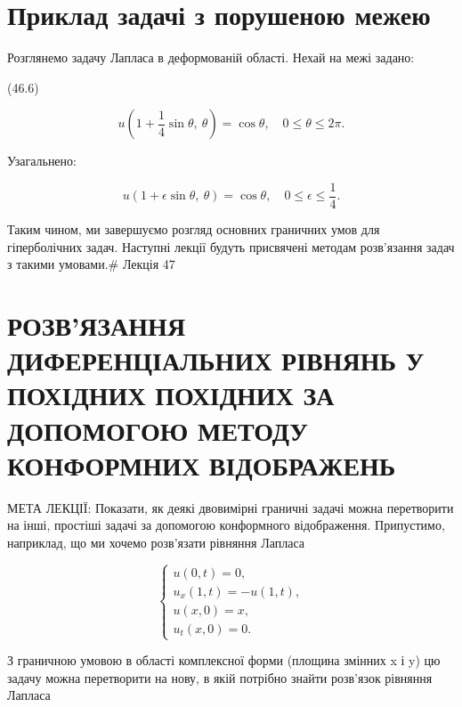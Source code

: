 \documentclass[
  ukrainian,
]{article}
\begin{document}
\section{Приклад задачі з порушеною
межею}\label{ux43fux440ux438ux43aux43bux430ux434-ux437ux430ux434ux430ux447ux456-ux437-ux43fux43eux440ux443ux448ux435ux43dux43eux44e-ux43cux435ux436ux435ux44e}

Розглянемо задачу Лапласа в деформованій області. Нехай на межі задано:

(46.6)

\[
u\left(1 + \frac{1}{4} \sin \theta,\ \theta\right) = \cos \theta,\quad 0 \le \theta \le 2\pi.
\]

Узагальнено:

\[
u(1+\epsilon\sin\theta,\ \theta) = \cos\theta,\quad 0 \le \epsilon \le \frac{1}{4}.
\]

Таким чином, ми завершуємо розгляд основних граничних умов для
гіперболічних задач. Наступні лекції будуть присвячені методам
розв'язання задач з такими умовами.\# Лекція 47

\section{РОЗВ'ЯЗАННЯ ДИФЕРЕНЦІАЛЬНИХ РІВНЯНЬ У ПОХІДНИХ ПОХІДНИХ ЗА
ДОПОМОГОЮ МЕТОДУ КОНФОРМНИХ
ВІДОБРАЖЕНЬ}\label{ux440ux43eux437ux432ux44fux437ux430ux43dux43dux44f-ux434ux438ux444ux435ux440ux435ux43dux446ux456ux430ux43bux44cux43dux438ux445-ux440ux456ux432ux43dux44fux43dux44c-ux443-ux43fux43eux445ux456ux434ux43dux438ux445-ux43fux43eux445ux456ux434ux43dux438ux445-ux437ux430-ux434ux43eux43fux43eux43cux43eux433ux43eux44e-ux43cux435ux442ux43eux434ux443-ux43aux43eux43dux444ux43eux440ux43cux43dux438ux445-ux432ux456ux434ux43eux431ux440ux430ux436ux435ux43dux44c}

МЕТА ЛЕКЦІЇ: Показати, як деякі двовимірні граничні задачі можна
перетворити на інші, простіші задачі за допомогою конформного
відображення. Припустимо, наприклад, що ми хочемо розв'язати рівняння
Лапласа

\[
\begin{cases} u(0, t) = 0, \\ u_x(1, t) = -u(1, t), \\ u(x, 0) = x, \\ u_t(x, 0) = 0. \end{cases}
\]

З граничною умовою в області комплексної форми (площина змінних x і y)
цю задачу можна перетворити на нову, в якій потрібно знайти розв'язок
рівняння Лапласа
\end{document}
